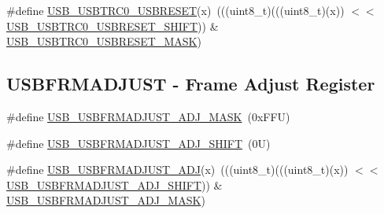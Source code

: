 \begin{DoxyCompactItemize}
\item 
\#define \mbox{\hyperlink{group___u_s_b___register___masks_ga004b6aa65751423c60c2fecc27798d47}{U\+S\+B\+\_\+\+U\+S\+B\+T\+R\+C0\+\_\+\+U\+S\+B\+R\+E\+S\+ET}}(x)~(((uint8\+\_\+t)(((uint8\+\_\+t)(x)) $<$$<$ \mbox{\hyperlink{group___u_s_b___register___masks_gab20fcb9276a34cbbd33ac0364c419f13}{U\+S\+B\+\_\+\+U\+S\+B\+T\+R\+C0\+\_\+\+U\+S\+B\+R\+E\+S\+E\+T\+\_\+\+S\+H\+I\+FT}})) \& \mbox{\hyperlink{group___u_s_b___register___masks_ga3b307f8358be6942775121b6a92243ab}{U\+S\+B\+\_\+\+U\+S\+B\+T\+R\+C0\+\_\+\+U\+S\+B\+R\+E\+S\+E\+T\+\_\+\+M\+A\+SK}})
\end{DoxyCompactItemize}
\subsection*{U\+S\+B\+F\+R\+M\+A\+D\+J\+U\+ST -\/ Frame Adjust Register}
\begin{DoxyCompactItemize}
\item 
\#define \mbox{\hyperlink{group___u_s_b___register___masks_ga3bbdc3dbdf46947a16a7b4429ad9a0c7}{U\+S\+B\+\_\+\+U\+S\+B\+F\+R\+M\+A\+D\+J\+U\+S\+T\+\_\+\+A\+D\+J\+\_\+\+M\+A\+SK}}~(0x\+F\+F\+U)
\item 
\#define \mbox{\hyperlink{group___u_s_b___register___masks_ga81985f8c59f9aa0c0340a70136b55098}{U\+S\+B\+\_\+\+U\+S\+B\+F\+R\+M\+A\+D\+J\+U\+S\+T\+\_\+\+A\+D\+J\+\_\+\+S\+H\+I\+FT}}~(0\+U)
\item 
\#define \mbox{\hyperlink{group___u_s_b___register___masks_ga9425a289b2e719d6aad583a33ddf1e4b}{U\+S\+B\+\_\+\+U\+S\+B\+F\+R\+M\+A\+D\+J\+U\+S\+T\+\_\+\+A\+DJ}}(x)~(((uint8\+\_\+t)(((uint8\+\_\+t)(x)) $<$$<$ \mbox{\hyperlink{group___u_s_b___register___masks_ga81985f8c59f9aa0c0340a70136b55098}{U\+S\+B\+\_\+\+U\+S\+B\+F\+R\+M\+A\+D\+J\+U\+S\+T\+\_\+\+A\+D\+J\+\_\+\+S\+H\+I\+FT}})) \& \mbox{\hyperlink{group___u_s_b___register___masks_ga3bbdc3dbdf46947a16a7b4429ad9a0c7}{U\+S\+B\+\_\+\+U\+S\+B\+F\+R\+M\+A\+D\+J\+U\+S\+T\+\_\+\+A\+D\+J\+\_\+\+M\+A\+SK}})
\end{DoxyCompactItemize}
